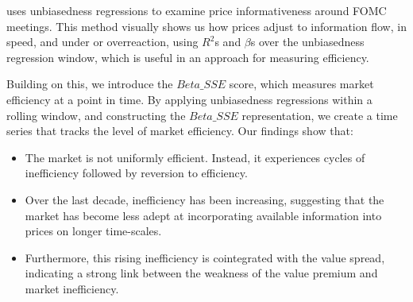 \citet{boguth_2023} uses unbiasedness regressions to examine price informativeness around FOMC meetings. 
This method visually shows us how prices adjust to information flow, in speed, and under or overreaction, using $R^2$s and $\beta$s over the unbiasedness regression window,
which is useful in an approach for measuring efficiency.

Building on this, we introduce the \textit{$Beta\_SSE$} score, which measures market efficiency at a point in time. 
By applying unbiasedness regressions within a rolling window, and constructing the \textit{$Beta\_SSE$} representation, we create a time series that tracks the level of market 
efficiency. \newline
\newline
Our findings show that:
\begin{itemize}
    \item The market is not uniformly efficient. Instead, it experiences cycles of inefficiency followed by reversion to efficiency.
    \item Over the last decade, inefficiency has been increasing, suggesting that the market has become less adept at incorporating available information into prices on longer time-scales.
    \item Furthermore, this rising inefficiency is cointegrated with the value spread, indicating a strong link between the weakness of the value premium and market inefficiency.
\end{itemize}